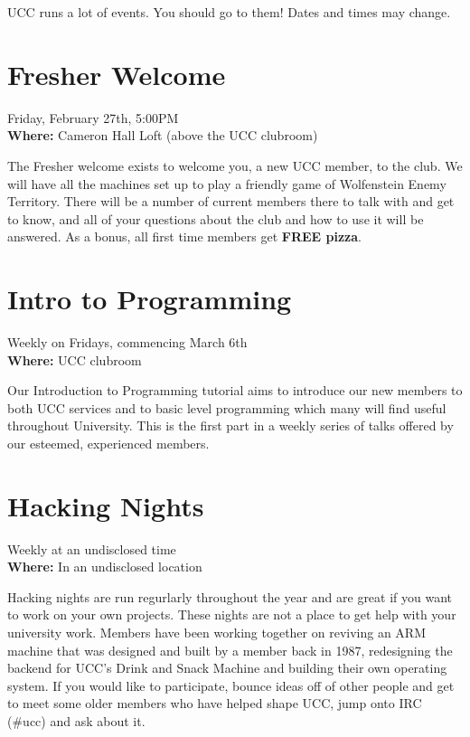 
UCC runs a lot of events. You should go to them! Dates and times may change. 

\newenvironment{event}[3]
{
	\begin{mdframed}[backgroundcolor=white,nobreak=true]
		\color{black}{\section{#1}}
		\begin{mdframed}[backgroundcolor=white]
			When: #2
			Where: #3
		\end{mdframed}
}{
	\end{mdframed}
}

\renewenvironment{event}[3]
{
	\section{#1}
	 #2 \\
	{\bf Where:} #3

}{}





\begin{event}{Fresher Welcome}{Friday, February 27th, 5:00PM}{Cameron Hall Loft (above the UCC clubroom)}
The Fresher welcome exists to welcome you, a new UCC member, to the club. We will have all the machines set up to play a friendly game of Wolfenstein Enemy Territory. There will be a number of current members there to talk with and get to know, and all of your questions about the club and how to use it will be answered. As a bonus, all first time members get {\bf FREE pizza}.
\end{event}

\begin{event}{Intro to Programming}{Weekly on Fridays, commencing March 6th}{UCC clubroom}
Our Introduction to Programming tutorial aims to introduce our new members to both UCC services and to basic level programming which many will find useful throughout University. This is the first part in a weekly series of talks offered by our esteemed, experienced members.
\end{event}

\begin{event}{Hacking Nights}{Weekly at an undisclosed time}{In an undisclosed location}
Hacking nights are run regurlarly throughout the year and are great if you want to work on your own projects.
These nights are not a place to get help with your university work.
Members have been working together on reviving an ARM machine that was designed and built by a member back in 1987, redesigning the backend for UCC's Drink and Snack Machine and building their own operating system.
If you would like to participate, bounce ideas off of other people and get to meet some older members who have helped shape UCC, jump onto IRC (\#ucc) and ask about it.
\end{event}

